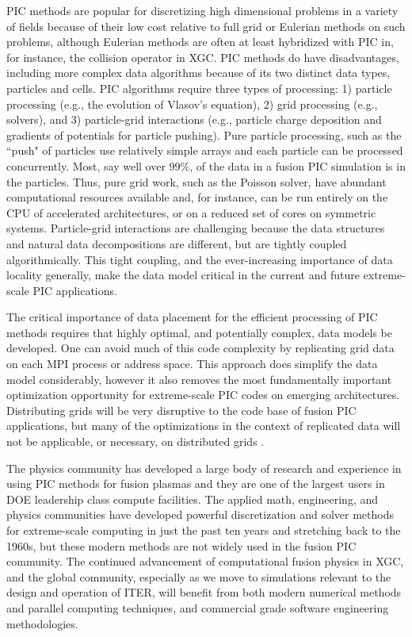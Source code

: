 \documentclass[review]{siamart}
\begin{document}
PIC methods are popular for discretizing high dimensional problems in a variety of fields because of their low cost relative to full grid or Eulerian methods on such problems, although Eulerian methods are often at least hybridized with PIC in, for instance, the collision operator in XGC.
PIC methods do have disadvantages, including more complex data algorithms because of its two distinct data types, particles and cells.
PIC algorithms require three types of processing: 1) particle processing (e.g., the evolution of Vlasov's equation), 2) grid processing (e.g., solvers), and 3) particle-grid interactions (e.g., particle charge deposition and gradients of potentials for particle pushing).
Pure particle processing, such as the ``push" of particles use relatively simple arrays and each particle can be processed concurrently.
Most, say well over $99\%$, of the data in a fusion PIC simulation is in the particles.
Thus, pure grid work, such as the Poisson solver, have abundant computational resources available and, for instance, can be run entirely on the CPU of accelerated architectures, or on a reduced set of cores on symmetric systems.
Particle-grid interactions are challenging because the data structures and natural data decompositions are different, but are tightly coupled algorithmically.
This tight coupling, and the ever-increasing importance of data locality generally, make the data model critical in the current and future extreme-scale PIC applications.

The critical importance of data placement for the efficient processing of PIC methods requires that highly optimal, and potentially complex, data models be developed.
One can avoid much of this code complexity by replicating grid data on each MPI process or address space.
This approach does simplify the data model considerably, however it also removes the most fundamentally important optimization opportunity for extreme-scale PIC codes on emerging architectures.
Distributing grids will be very disruptive to the code base of fusion PIC applications, but many of the optimizations in the context of replicated data will not be applicable, or necessary, on distributed grids \cite{Adams-07a}.

The physics community has developed a large body of research and experience in using PIC methods for fusion plasmas and they are one of the largest users in DOE leadership class compute facilities.
The applied math, engineering, and physics communities have developed powerful discretization and solver methods for extreme-scale computing in just the past ten years and stretching back to the 1960s, but these modern methods are not widely used in the fusion PIC community.
The continued advancement of computational fusion physics in XGC, and the global community, especially as we move to simulations relevant to the design and operation of ITER, will benefit from both modern numerical methods and parallel computing techniques, and commercial grade software engineering methodologies.
\end{document}
